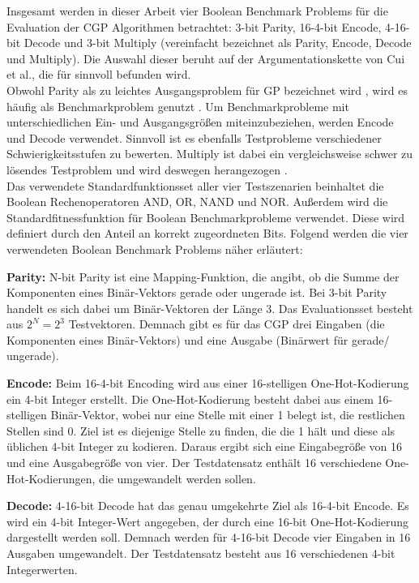 Insgesamt werden in dieser Arbeit vier Boolean Benchmark Problems für die Evaluation der CGP Algorithmen betrachtet: 3-bit Parity, 16-4-bit Encode, 4-16-bit Decode und 3-bit Multiply (vereinfacht bezeichnet als Parity, Encode, Decode und Multiply).
Die Auswahl dieser beruht auf der Argumentationskette von Cui et al., die für sinnvoll befunden wird. \cite{cui_equidistant_2023}\\
Obwohl Parity als zu leichtes Ausgangsproblem für GP bezeichnet wird \cite{white_better_2013}, wird es häufig als Benchmarkproblem genutzt \cite{yu_neutrality_2001, kaufmann_kalkreuth_2017, kaufmann_kalkreuth_2020}.
Um Benchmarkprobleme mit unterschiedlichen Ein- und Ausgangsgrößen miteinzubeziehen, werden Encode und Decode verwendet.
Sinnvoll ist es ebenfalls Testprobleme verschiedener Schwierigkeitsstufen zu bewerten.
Multiply ist dabei ein vergleichsweise schwer zu lösendes Testproblem und wird deswegen herangezogen \cite{walker_2008}.\\

Das verwendete Standardfunktionsset aller vier Testszenarien beinhaltet die Boolean Rechenoperatoren AND, OR, NAND und NOR.
Außerdem wird die Standardfitnessfunktion für Boolean Benchmarkprobleme verwendet.
Diese wird definiert durch den Anteil an korrekt zugeordneten Bits. \cite{cui_equidistant_2023}
Folgend werden die vier verwendeten Boolean Benchmark Problems näher erläutert:

\textbf{Parity:} N-bit Parity ist eine Mapping-Funktion, die angibt, ob die Summe der Komponenten eines Binär-Vektors gerade oder ungerade ist.
Bei 3-bit Parity handelt es sich dabei um Binär-Vektoren der Länge 3.
Das Evaluationsset besteht aus $2^N=2^3$ Testvektoren. \cite{hohil_1999}
Demnach gibt es für das CGP drei Eingaben (die Komponenten eines Binär-Vektors) und eine Ausgabe (Binärwert für \glqq gerade\grqq\space / \glqq ungerade\grqq).

\textbf{Encode:} Beim 16-4-bit Encoding wird aus einer 16-stelligen One-Hot-Kodierung ein 4-bit Integer erstellt.
Die One-Hot-Kodierung besteht dabei aus einem 16-stelligen Binär-Vektor, wobei nur eine Stelle mit einer 1 belegt ist, die restlichen Stellen sind 0.
Ziel ist es diejenige Stelle zu finden, die die 1 hält und diese als üblichen 4-bit Integer zu kodieren. \cite{cui_weighted_mutation, goldman_2015}
Daraus ergibt sich eine Eingabegröße von 16 und eine Ausgabegröße von vier.
Der Testdatensatz enthält 16 verschiedene One-Hot-Kodierungen, die umgewandelt werden sollen.

\textbf{Decode:} 4-16-bit Decode hat das genau umgekehrte Ziel als 16-4-bit Encode.
Es wird ein 4-bit Integer-Wert angegeben, der durch eine 16-bit One-Hot-Kodierung dargestellt werden soll. \cite{cui_weighted_mutation}
Demnach werden für 4-16-bit Decode vier Eingaben in 16 Ausgaben umgewandelt.
Der Testdatensatz besteht aus 16 verschiedenen 4-bit Integerwerten.

